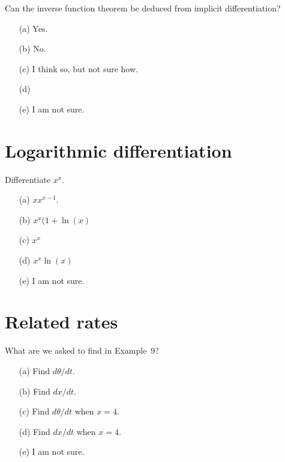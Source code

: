 \documentclass[14pt]{beamer}
\begin{document}
\begin{frame}
  Can the inverse function theorem be deduced from implicit differentiation?

  \medskip
  \begin{itemize} \setlength\itemsep{2ex}
    \item[(a)] Yes.
    \item[(b)] No.
    \item[(c)] I think so, but not sure how.
    \item[(d)] 
    \item[(e)] I am not sure.
  \end{itemize} 
\end{frame}


\section{Logarithmic differentiation}
\begin{frame}
  Differentiate \(x^{x}\).

  \medskip
  \begin{itemize} \setlength\itemsep{2ex}
    \item[(a)] \(x x^{x-1}\).
    \item[(b)] \(x^{x}(1 + \ln(x)\)
    \item[(c)] \(x^{x}\)
    \item[(d)] \(x^{x}\ln(x)\)
    \item[(e)] I am not sure.
  \end{itemize} 
\end{frame}

\section{Related rates}
\begin{frame}[t]
  What are we asked to find in Example~9?

  \medskip
  \begin{itemize} \setlength\itemsep{2ex}
    \item[(a)] Find \(d\theta/dt\).
    \item[(b)] Find \(dx/dt\).
    \item[(c)] Find \(d\theta/dt\) when \(x = 4\).
    \item[(d)] Find \(dx/dt\) when \(x = 4\).
    \item[(e)] I am not sure.
  \end{itemize} 
\end{frame}
\end{document}
